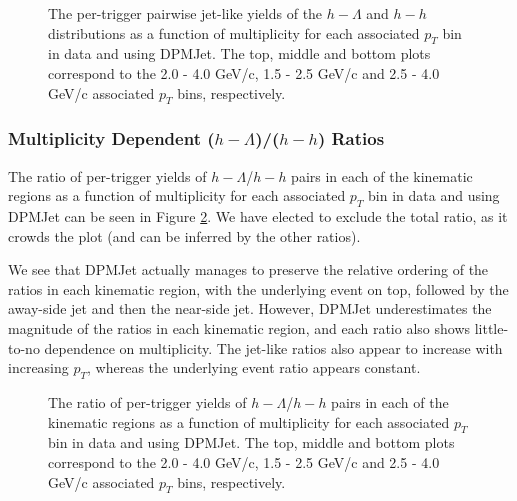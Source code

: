 \begin{figure}[ht]
\centering
\begin{subfigure}{
\texttt{[image: figures/pairwise\_plot\_with\_dpmjet.pdf]}}
\end{subfigure}
\begin{subfigure}{
\texttt{[image: figures/pairwise\_plot\_lowpt\_with\_dpmjet.pdf]}}
\end{subfigure}
\begin{subfigure}{
\texttt{[image: figures/pairwise\_plot\_highpt\_with\_dpmjet.pdf]}}
\end{subfigure}
\caption{The per-trigger pairwise jet-like yields of the $h-\Lambda$ and $h-h$ distributions as a function of multiplicity for each associated $p_{T}$ bin in data and using DPMJet. The top, middle and bottom plots correspond to the 2.0 - 4.0 GeV/c, 1.5 - 2.5 GeV/c and 2.5 - 4.0 GeV/c associated $p_{T}$ bins, respectively.}
\label{pairwise_yields_modelcomp_figure}
\end{figure}

\subsubsection{Multiplicity Dependent ($h-\Lambda$)/($h-h$) Ratios}
\label{lambda_hadron_ratio_modelcomp}

The ratio of per-trigger yields of $h-\Lambda$/$h-h$ pairs in each of the kinematic regions as a function of multiplicity for each associated $p_{T}$ bin in data and using DPMJet can be seen in Figure \ref{lambda_hadron_ratio_modelcomp_figure}. We have elected to exclude the total ratio, as it crowds the plot (and can be inferred by the other ratios). 

We see that DPMJet actually manages to preserve the relative ordering of the ratios in each kinematic region, with the underlying event on top, followed by the away-side jet and then the near-side jet. However, DPMJet underestimates the magnitude of the ratios in each kinematic region, and each ratio also shows little-to-no dependence on multiplicity. The jet-like ratios also appear to increase with increasing $p_{T}$, whereas the underlying event ratio appears constant.

\begin{figure}[ht]
\centering
\begin{subfigure}{
\texttt{[image: figures/ratio\_plot\_with\_dpmjet.pdf]}}
\end{subfigure}
\begin{subfigure}{
\texttt{[image: figures/ratio\_plot\_lowpt\_with\_dpmjet.pdf]}}
\end{subfigure}
\begin{subfigure}{
\texttt{[image: figures/ratio\_plot\_highpt\_with\_dpmjet.pdf]}}
\end{subfigure}
\caption{The ratio of per-trigger yields of $h-\Lambda$/$h-h$ pairs in each of the kinematic regions as a function of multiplicity for each associated $p_{T}$ bin in data and using DPMJet. The top, middle and bottom plots correspond to the 2.0 - 4.0 GeV/c, 1.5 - 2.5 GeV/c and 2.5 - 4.0 GeV/c associated $p_{T}$ bins, respectively.}
\label{lambda_hadron_ratio_modelcomp_figure}
\end{figure}


